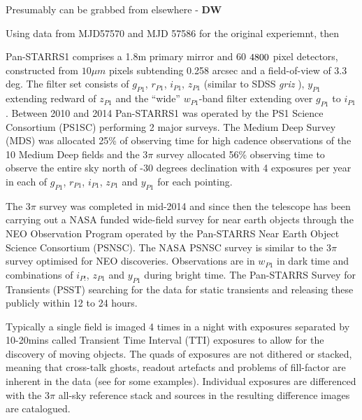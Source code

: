 \documentclass[a4paper,fleqn,usenatbib]{mnras}
\begin{document}
Presumably can be grabbed from elsewhere - \textbf{DW}

Using data from MJD57570 and MJD 57586 for the original experiemnt, then 

Pan-STARRS1 comprises a 1.8m primary mirror \citep{Kaiser10} and 60 $4800\time 4800$ pixel detectors, constructed from $10\mu m$ pixels subtending 0.258 arcsec \citep{Magnier13} and a field-of-view of 3.3 deg.  The filter set consists of $g_{P1}$, $r_{P1}$, $i_{P1}$, $z_{P1}$ (similar to SDSS \textit{griz} \citep{York00}), $y_{P1}$ extending
redward of $z_{P1}$ and the ``wide'' $w_{P1}$-band filter extending over $g_{P1}$ to $i_{P1}$ \citep{Tonry12b}.  Between 2010 and 2014 Pan-STARRS1 was operated by the PS1 Science Consortium (PS1SC) performing 2 major surveys.  The Medium Deep Survey (MDS) was allocated 25\% of observing time for high cadence observations of the 10 Medium Deep fields and the $3\pi$ survey allocated 56\% observing time to observe the entire sky north of -30 degrees declination with 4 exposures per year in each of $g_{P1}$, $r_{P1}$, $i_{P1}$, $z_{P1}$ and $y_{P1}$ for each pointing.

The $3\pi$ survey was completed in mid-2014 and since then the telescope has been carrying out a NASA funded wide-field survey for near earth objects through the NEO Observation Program operated by the Pan-STARRS Near Earth Object Science Consortium (PSNSC).  The NASA PSNSC survey is similar to the $3\pi$ survey optimised for NEO discoveries.  Observations are in $w_{P1}$ in dark time and combinations of $i_{P!}$, $z_{P1}$ and $y_{P1}$ during bright time.  The Pan-STARRS Survey for Transients (PSST) \citep{Huber15a} searching for the data for static transients and releasing these publicly within 12 to 24 hours.

Typically a single field is imaged 4 times in a night with exposures separated by 10-20mins called Transient Time Interval (TTI) exposures to allow for the discovery of moving objects.  The quads of exposures are not dithered or stacked, meaning that cross-talk ghosts, readout artefacts and problems of fill-factor are inherent in the data (see \citet{Denneau13} for some examples).  Individual exposures are differenced with the $3\pi$ all-sky reference stack and sources in the resulting difference images are catalogued.
\end{document}
